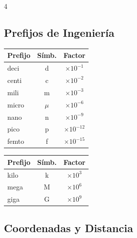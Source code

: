\documentclass[9pt, landscape, letterpaper]{extarticle}
\begin{document}

\begin{multicols}{4}

  \subsection{Prefijos de Ingeniería}

  \begin{tablabox}[Submúltiplos]
    \tablacompacta
    \begin{tabular}{@{}lcc@{}}
      \toprule
      Prefijo & Símb. & Factor            \\
      \midrule
      deci    & d     & $\times 10^{-1}$  \\
      centi   & c     & $\times 10^{-2}$  \\
      mili    & m     & $\times 10^{-3}$  \\
      micro   & $\mu$ & $\times 10^{-6}$  \\
      nano    & n     & $\times 10^{-9}$  \\
      pico    & p     & $\times 10^{-12}$ \\
      femto   & f     & $\times 10^{-15}$ \\
      \bottomrule
    \end{tabular}
  \end{tablabox}

  \begin{tablabox}[Múltiplos]
    \tablacompacta
    \begin{tabular}{@{}lcc@{}}
      \toprule
      Prefijo & Símb. & Factor          \\
      \midrule
      kilo    & k     & $\times 10^{3}$ \\
      mega    & M     & $\times 10^{6}$ \\
      giga    & G     & $\times 10^{9}$ \\
      \bottomrule
    \end{tabular}
  \end{tablabox}

  \subsection{Coordenadas y Distancia}


\end{multicols}
\end{document}

